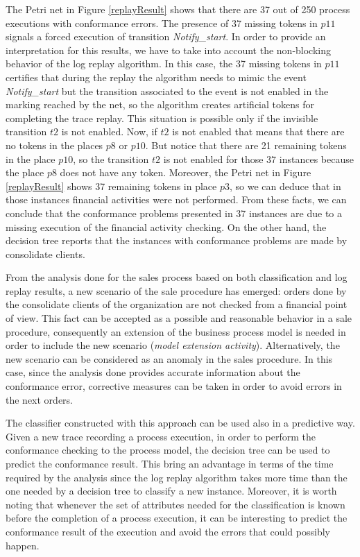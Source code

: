 \documentclass{llncs}
\begin{document}
The Petri net in Figure \ref{replayResult} shows that there are 37 out of 250 process executions with conformance errors. The presence of 37 missing tokens in $p11$ signals a forced execution of  transition \emph{Notify\_start}. In order to provide an interpretation for this results, we have to take into account the non-blocking behavior of the log replay algorithm. In this case, the 37 missing tokens in $p11$ certifies that during the replay the algorithm needs to mimic the event \emph{Notify\_start} but the transition associated to the event is not enabled in the marking reached by the net, so the algorithm creates artificial tokens for completing the trace replay. This situation is possible only if the invisible transition $t2$ is not enabled. Now, if $t2$ is not enabled that means that there are no tokens in the places $p8$ or $p10$. But notice that there are 21 remaining tokens in the place $p10$, so the transition $t2$ is not enabled for those $37$ instances because the place $p8$ does not have any token. Moreover, the Petri net in Figure \ref{replayResult} shows 37 remaining tokens in place $p3$, so we can deduce that in those instances financial activities were not performed. From these facts, we can conclude that the conformance problems presented in  37 instances are due to a missing execution of the financial activity checking. On the other hand, the decision tree reports that the instances with conformance problems are made by consolidate clients.

From the analysis done for the sales process based on both classification and log replay results, a new scenario of the sale procedure has emerged: orders done by the consolidate clients of the organization are not checked from a financial point of view. This fact can be accepted as a possible and reasonable behavior in a sale procedure, consequently an extension of the business process model is needed in order to include the new scenario (\emph{model extension activity}). Alternatively, the new scenario can be considered as an anomaly in the sales procedure. In this case, since the analysis done provides accurate information about the conformance error, corrective measures can be taken in order to avoid errors in the next orders.

The classifier constructed with this approach can be used also in a predictive way. Given a new trace recording a process execution, in order to perform the conformance checking to the process model, the decision tree can be used to predict the conformance result. This bring an advantage in terms of the time required by the analysis since the log replay algorithm takes more time than the one needed by a decision tree to classify a new instance. Moreover, it is worth noting that whenever the set of attributes needed for the classification is known before the completion of a process execution, it can be interesting to predict the conformance result of the execution and avoid the errors that could possibly happen.
\end{document}
